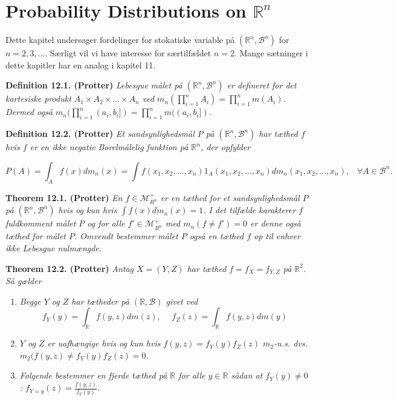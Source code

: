 \documentclass[
]{book}
\providecommand{\tightlist}{%
  \setlength{\itemsep}{0pt}\setlength{\parskip}{0pt}}
\begin{document}
\hypertarget{probability-distributions-on-mathbb-rn}{%
\section{\texorpdfstring{Probability Distributions on \(\mathbb R^n\)}{Probability Distributions on \textbackslash mathbb R\^{}n}}\label{probability-distributions-on-mathbb-rn}}

Dette kapitel undersøger fordelinger for stokatiske variable på \((\mathbb{R}^n,\mathcal{B}^n)\) for \(n=2,3,...\). Særligt vil vi have interesse for særtilfældet \(n=2\). Mange sætninger i dette kapitler har en analog i kapitel 11.

\textbf{Definition 12.1. (Protter)} \emph{Lebesgue målet på \((\mathbb{R}^n,\mathcal{B}^n)\) er defineret for det kartesiske produkt \(A_1\times A_2\times ...\times A_n\) ved \(m_n(\prod_{i=1}^n A_i)=\prod_{i=1}^n m(A_i)\). Dermed også \(m_n(\prod_{i=1}^n (a_i,b_i])=\prod_{i=1}^n m((a_i,b_i])\).}

\textbf{Definition 12.2. (Protter)} \emph{Et sandsynlighedsmål \(P\) på \((\mathbb{R}^n,\mathcal{B}^n)\) har tæthed \(f\) hvis \(f\) er en ikke negativ Borelmålelig funktion på \(\mathbb{R}^n\), der opfylder}

\[
P(A)=\int_A f(x)dm_n(x)=\int f(x_1,x_2,...,x_n)1_A(x_1,x_2,...,x_n)dm_n(x_1,x_2,...,x_n),\hspace{10pt} \forall A\in\mathcal{B}^n.
\]

\textbf{Theorem 12.1. (Protter)} \emph{En \(f\in\mathcal{M}_{R^n}^+\) er en tæthed for et sandsynlighedsmål \(P\) på \((\mathbb{R}^n,\mathcal{B}^n)\) hvis og kun hvis \(\int f(x)dm_n(x)=1\). I det tilfælde karakterer \(f\) fuldkomment målet \(P\) og for alle \(f'\in\mathcal{M}_{R^n}^+\) med \(m_n(f\ne f')=0\) er denne også tæthed for målet \(P\). Omvendt bestemmer målet \(P\) også en tæthed \(f\) op til enhver ikke Lebesgue nulmængde.}

\textbf{Theorem 12.2. (Protter)} \emph{Antag \(X=(Y,Z)\) har tæthed \(f=f_X=f_{Y,Z}\) på \(\mathbb{R}^2\). Så gælder}

\begin{enumerate}
\def\labelenumi{\alph{enumi}.}
\tightlist
\item
  \emph{Begge \(Y\) og \(Z\) har tætheder på \((\mathbb{R},\mathcal{B})\) givet ved}
  \[
    f_Y(y)=\int_{\mathbb{R}}f(y,z)dm(z),\hspace{15pt}f_Z(z)=\int_{\mathbb{R}}f(y,z)dm(y)
    \]
\item
  \emph{\(Y\) og \(Z\) er uafhængige hvis og kun hvis \(f(y,z)=f_Y(y)f_Z(z)\) \(m_2\)-n.s. dvs. \(m_2(f(y,z)\ne f_Y(y)f_Z(z)=0\).}
\item
  \emph{Følgende bestemmer en fjerde tæthed på \(\mathbb{R}\) for alle \(y\in\mathbb{R}\) sådan at \(f_Y(y)\ne 0\): \(f_{Y=y}(z)=\frac{f(y,z)}{f_Y(y)}\).}
\end{enumerate}
\end{document}
